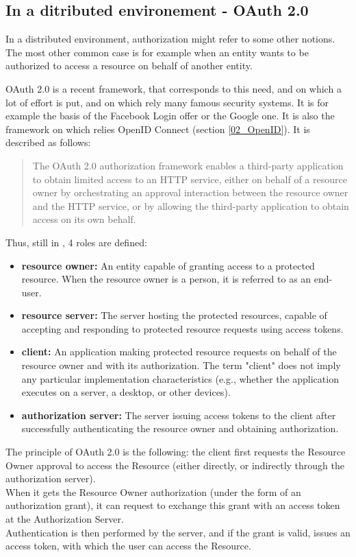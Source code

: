 \subsection{In a ditributed environement - OAuth 2.0}
\label{02_OAuth}

In a distributed environment, authorization might refer to some other notions. The most other common case is for example when an entity wants to be authorized to access a resource on behalf of another entity.

OAuth 2.0 is a recent framework, that corresponds to this need, and on which a lot of effort is put, and on which rely many famous security systems. It is for example the basis of the Facebook Login offer or the Google one. It is also the framework on which relies OpenID Connect (section \ref{02_OpenID}). It  is described as follows\cite{hardt2012oauth}: 

\begin{quote}
	The OAuth 2.0 authorization framework enables a third-party
	application to obtain limited access to an HTTP service, either on
	behalf of a resource owner by orchestrating an approval interaction
	between the resource owner and the HTTP service, or by allowing the
	third-party application to obtain access on its own behalf.
\end{quote}
Thus, still in \cite{hardt2012oauth}, 4 roles are defined:
\begin{itemize}
	\item \textbf{resource owner:} An entity capable of granting access to a protected resource.
	When the resource owner is a person, it is referred to as an
	end-user.
	\item \textbf{resource server:} The server hosting the protected resources, capable of accepting
	and responding to protected resource requests using access tokens.
	\item \textbf{client:} An application making protected resource requests on behalf of the
	resource owner and with its authorization.  The term "client" does
	not imply any particular implementation characteristics (e.g.,
	whether the application executes on a server, a desktop, or other
	devices).
	\item \textbf{authorization server:} The server issuing access tokens to the client after successfully
	authenticating the resource owner and obtaining authorization.
\end{itemize}

The principle of OAuth 2.0 is the following: the client first requests the Resource Owner approval to access the Resource (either directly, or indirectly through the authorization server). 
\\When it gets the Resource Owner authorization (under the form of an authorization grant), it can request to exchange this grant with an access token at the Authorization Server. 
\\Authentication is then performed by the server, and if the grant is valid, issues an access token, with which the user can access the Resource.
\\

